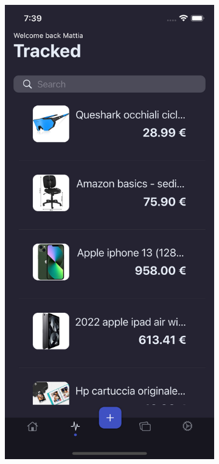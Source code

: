 \begin{figure}[h!]
        \centering
        \begin{subfigure}[b]{0.3\textwidth}
            \centering
            \includegraphics[width=\textwidth]{images/interfaces/user_tracked_screen.png}

\end{subfigure}
\end{figure}
